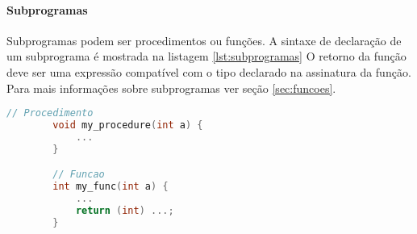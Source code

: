 \paragraph{Subprogramas} Subprogramas podem ser procedimentos ou funções.
A sintaxe de declaração de um subprograma é mostrada na listagem \ref{lst:subprogramas}
O retorno da função deve ser uma expressão compatível com o tipo declarado na assinatura da função.
Para mais informações sobre subprogramas ver seção \ref{sec:funcoes}.
\begin{lstlisting}[language=C, caption=Declaração de subprogramas, label=lst:subprogramas]
        // Procedimento
        void my_procedure(int a) {
            ...
        }

        // Funcao
        int my_func(int a) {
            ...
            return (int) ...;
        }
\end{lstlisting}



